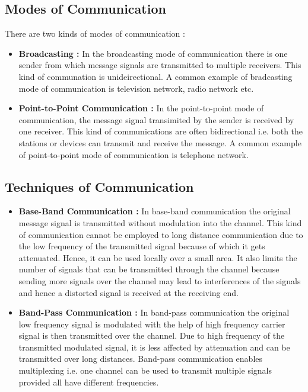 \documentclass[12pt,a4paper]{article}%
\begin{document}
\begin{flushleft}
		\subsection{Modes of Communication}
		\begin{flushleft}
			There are two kinds of modes of communication :
			\begin{itemize}
				\item \textbf{Broadcasting : } In the broadcasting mode of communication there is one sender from which message signals are transmitted to multiple receivers. This kind of communation is unideirectional. A common example of
				bradcasting mode of communication is television network, radio network etc.
				\item \textbf{Point-to-Point Communication : } In the point-to-point mode of communication, the message signal transimited by the sender is received by one receiver. This kind of communications are often bidirectional i.e. both the 
				stations or devices can transmit and receive the message. A common example of point-to-point mode of communication is telephone network.\\\bigskip
			\end{itemize}
		\end{flushleft}
		
		\subsection{Techniques of Communication}
		\begin{flushleft}
			\begin{itemize}
				\item \textbf{Base-Band Communication : } In base-band communication the original message signal is transmitted without modulation into the channel. This kind of communication cannot be employed to long distance communication
				due to the low frequency of the transmitted signal because of which it gets attenuated. Hence, it can be used locally over a small area. It also limits the number of signals that can be
				transmitted through the channel because sending more signals over the channel may lead to interferences of the signals and hence a distorted signal is received at the receiving end.
				\item \textbf{Band-Pass Communication : } In band-pass communication the original low frequency signal is modulated with the help of high frequency carrier signal is then transmitted over the channel. Due to high frequency of
				the transmitted modulated signal, it is less affected by attenuation and can be transmitted over long distances. Band-pass communication enables multiplexing i.e. one channel can be used
				to transmit multiple signals provided all have different frequencies.\\\bigskip
			\end{itemize}
		\end{flushleft}
		
	\end{flushleft}
	\pagebreak
\end{document}
